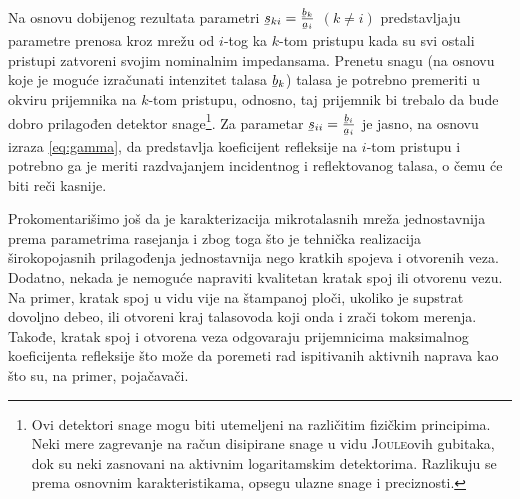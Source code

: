 \documentclass[a4paper, 12pt, diplomski]{etf}
\newcommand{\faz}[1]{\underaccent{\bar}{#1}}
\begin{document}
%
Na osnovu dobijenog rezultata parametri $\faz s_{ki} = \frac{\faz b_k}{\faz a_i}$ $(k\neq i)$ predstavljaju parametre prenosa kroz mrežu od $i$-tog
ka $k$-tom pristupu kada su svi ostali pristupi zatvoreni svojim nominalnim impedansama. 
Prenetu snagu (na osnovu koje je moguće izračunati intenzitet talasa $\faz{b}_k$) talasa je potrebno 
premeriti u okviru prijemnika na $k$-tom pristupu, odnosno, 
taj prijemnik bi trebalo da bude dobro prilagođen detektor
snage\footnote{
Ovi detektori snage mogu biti utemeljeni na različitim 
fizičkim principima. Neki mere zagrevanje na račun disipirane snage
u vidu \textsc{Joule}ovih gubitaka, dok su neki zasnovani 
na aktivnim logaritamskim detektorima. Razlikuju se 
prema
osnovnim karakteristikama, opsegu ulazne snage i preciznosti.
}. Za parametar  $\faz s_{ii} = \frac{\faz b_i}{\faz a_i}$ je jasno,
na osnovu izraza \eqref{eq:gamma}, 
da predstavlja koeficijent 
refleksije na $i$-tom pristupu i potrebno ga je meriti razdvajanjem incidentnog 
i reflektovanog talasa, o čemu će biti reči kasnije.
%
%

Prokomentarišimo još da je karakterizacija mikrotalasnih
mreža jednostavnija prema parametrima rasejanja i zbog 
toga što je tehnička realizacija širokopojasnih 
prilagođenja jednostavnija nego kratkih spojeva i
otvorenih veza. 
Dodatno, 
nekada je nemoguće napraviti kvalitetan kratak spoj ili otvorenu vezu. Na primer, kratak
spoj u vidu  
vije na štampanoj ploči, ukoliko je supstrat
dovoljno debeo, ili otvoreni kraj talasovoda
koji onda i zrači tokom merenja. 
Takođe, kratak spoj i otvorena veza odgovaraju
prijemnicima maksimalnog koeficijenta 
refleksije što može da poremeti rad 
ispitivanih aktivnih naprava kao što su,
na primer, pojačavači.
\end{document}
